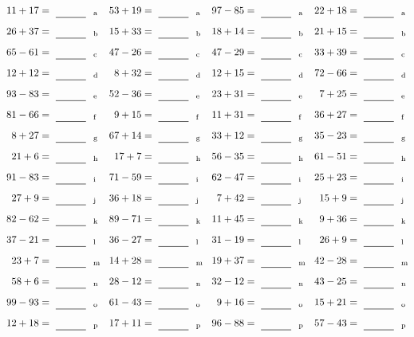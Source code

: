 \documentclass
[
  draft    = true,
  fontsize = 11pt,
  parskip  = half-
]
{scrartcl}
\begin{document}
\clearpage
\begin{align*}
    \pline{11+17}&=\rline{a}
  & \pline{53+19}&=\rline{a}
  & \pline{97-85}&=\rline{a}
  & \pline{22+18}&=\rline{a} \\[1ex]
    \pline{26+37}&=\rline{b}
  & \pline{15+33}&=\rline{b}
  & \pline{18+14}&=\rline{b}
  & \pline{21+15}&=\rline{b} \\[1ex]
    \pline{65-61}&=\rline{c}
  & \pline{47-26}&=\rline{c}
  & \pline{47-29}&=\rline{c}
  & \pline{33+39}&=\rline{c} \\[1ex]
    \pline{12+12}&=\rline{d}
  & \pline{8+32}&=\rline{d}
  & \pline{12+15}&=\rline{d}
  & \pline{72-66}&=\rline{d} \\[1ex]
    \pline{93-83}&=\rline{e}
  & \pline{52-36}&=\rline{e}
  & \pline{23+31}&=\rline{e}
  & \pline{7+25}&=\rline{e} \\[1ex]
    \pline{81-66}&=\rline{f}
  & \pline{9+15}&=\rline{f}
  & \pline{11+31}&=\rline{f}
  & \pline{36+27}&=\rline{f} \\[1ex]
    \pline{8+27}&=\rline{g}
  & \pline{67+14}&=\rline{g}
  & \pline{33+12}&=\rline{g}
  & \pline{35-23}&=\rline{g} \\[1ex]
    \pline{21+6}&=\rline{h}
  & \pline{17+7}&=\rline{h}
  & \pline{56-35}&=\rline{h}
  & \pline{61-51}&=\rline{h} \\[1ex]
    \pline{91-83}&=\rline{i}
  & \pline{71-59}&=\rline{i}
  & \pline{62-47}&=\rline{i}
  & \pline{25+23}&=\rline{i} \\[1ex]
    \pline{27+9}&=\rline{j}
  & \pline{36+18}&=\rline{j}
  & \pline{7+42}&=\rline{j}
  & \pline{15+9}&=\rline{j} \\[1ex]
    \pline{82-62}&=\rline{k}
  & \pline{89-71}&=\rline{k}
  & \pline{11+45}&=\rline{k}
  & \pline{9+36}&=\rline{k} \\[1ex]
    \pline{37-21}&=\rline{l}
  & \pline{36-27}&=\rline{l}
  & \pline{31-19}&=\rline{l}
  & \pline{26+9}&=\rline{l} \\[1ex]
    \pline{23+7}&=\rline{m}
  & \pline{14+28}&=\rline{m}
  & \pline{19+37}&=\rline{m}
  & \pline{42-28}&=\rline{m} \\[1ex]
    \pline{58+6}&=\rline{n}
  & \pline{28-12}&=\rline{n}
  & \pline{32-12}&=\rline{n}
  & \pline{43-25}&=\rline{n} \\[1ex]
    \pline{99-93}&=\rline{o}
  & \pline{61-43}&=\rline{o}
  & \pline{9+16}&=\rline{o}
  & \pline{15+21}&=\rline{o} \\[1ex]
    \pline{12+18}&=\rline{p}
  & \pline{17+11}&=\rline{p}
  & \pline{96-88}&=\rline{p}
  & \pline{57-43}&=\rline{p}
\end{align*}
\end{document}
